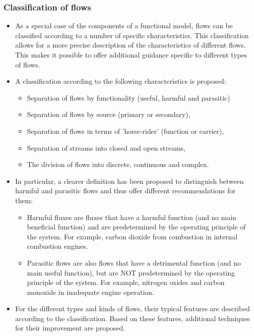 \documentclass[a4paper,11pt]{article}
\begin{document}
\subsubsection{Classification of flows}
\begin{itemize}
\item As a special case of the components of a functional model, flows can be
  classified according to a number of specific characteristics. This
  classification allows for a more precise description of the characteristics
  of different flows. This makes it possible to offer additional guidance
  specific to different types of flows.
\item A classification according to the following characteristics is proposed:
  \begin{itemize}
  \item Separation of flows by functionality (useful, harmful and parasitic)
  \item Separation of flows by source (primary or secondary),
  \item Separation of flows in terms of 'horse-rider' (function or carrier),
  \item Separation of streams into closed and open streams,
  \item The division of flows into discrete, continuous and complex.
  \end{itemize}
\item In particular, a clearer definition has been proposed to distinguish
  between harmful and parasitic flows and thus offer different recommendations
  for them:
  \begin{itemize}
  \item Harmful fluxes are fluxes that have a harmful function (and no main
    beneficial function) and are predetermined by the operating principle of
    the system. For example, carbon dioxide from combustion in internal
    combustion engines.
  \item Parasitic flows are also flows that have a detrimental function (and
    no main useful function), but are NOT predetermined by the operating
    principle of the system. For example, nitrogen oxides and carbon monoxide
    in inadequate engine operation.
  \end{itemize}
\item For the different types and kinds of flows, their typical features are
  described according to the classification. Based on these features,
  additional techniques for their improvement are proposed.
\end{itemize}
\end{document}
